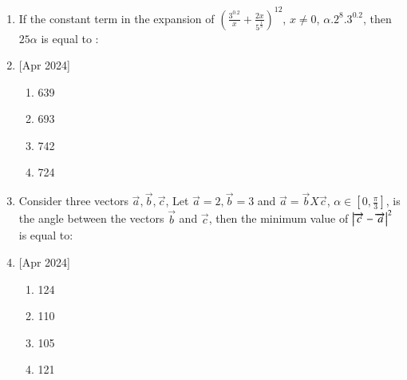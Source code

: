 \documentclass[journal]{IEEEtran}
\begin{document}
\begin{enumerate}
    \item If the constant term in the expansion of $(\frac{3^{0.2}}{x}+\frac{2x}{5^\frac{1}{3}})^{12}$, $x \neq 0$, $\alpha .2^{8}.3^{0.2}$, then $25\alpha$ is  equal to :
     \item{[Apr 2024]}
		\begin{multicols}{4}
			\begin{enumerate}
				\item 639
    \item 693
    \item 742
    \item 724
			\end{enumerate}
		\end{multicols}

    \item Consider three vectors $\overrightarrow{a},\overrightarrow{b},\overrightarrow{c}$, Let $\overrightarrow{a}=2,\overrightarrow{b}=3$ and $\overrightarrow{a}=\overrightarrow{b}X\overrightarrow{c}$, $\alpha \in [0,\frac{\pi}{3}]$, is the angle between the vectors $\overrightarrow{b}$ and $\overrightarrow{c}$, then the minimum value of $\left\vert\overrightarrow{c}-\overrightarrow{a}\right\vert^2$ is equal to:
     \item{[Apr 2024]}
		\begin{multicols}{4}
			\begin{enumerate}
				
				\item 124
    \item 110
     \item 105
      \item 121
			\end{enumerate}
		\end{multicols}


\end{enumerate}
\end{document}
